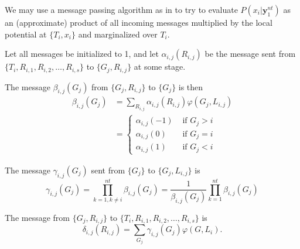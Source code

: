 
We may use a message passing algorithm as in \cite{aji} to try to
evaluate  $P(x_i|\mathbf{y}_1^{nt})$ as an (approximate) product
of all incoming messages multiplied by the local potential at
$\{T_i,x_i\}$ and marginalized over $T_i$.

Let all messages be initialized to 1, and let
$\alpha_{i,j}(R_{i,j})$ be the message sent from $\{T_i,
R_{i,1},R_{i,2},\dots, R_{i,s}\}$ to $\{G_j,R_{i,j}\}$ at some
stage.

The message $\beta_{i,j}(G_j)$ from $\{G_j,R_{i,j}\}$ to $\{G_j\}$
is then
\begin{eqnarray*}
\beta_{i,j}(G_j)&=\sum_{R_{i,j}}\alpha_{i,j}(R_{i,j})\varphi
(G_j,L_{i,j})\\
{}&=\left\{ \begin{array}{ccc}\alpha_{i,j}(-1) & \text{ if }
G_j>i\\
\alpha_{i,j}(0) & \text{ if }
G_j=i\\
\alpha_{i,j}(1) & \text{ if } G_j<i
\end{array}\right.
\end{eqnarray*}

The message $\gamma_{i,j}(G_j)$ sent from $\{G_j\}$ to
$\{G_j,L_{i,j}\}$ is
\begin{equation}
\gamma_{i,j}(G_j)=\prod_{k=1,k\neq
i}^{nt}\beta_{i,j}(G_j)=\frac{1}{\beta_{i,j}(G_j)}\prod_{k=1}^{nt}\beta_{i,j}(G_j)
\end{equation}

The message from $\{G_j,R_{i,j}\}$ to $\{T_i,
R_{i,1},R_{i,2},\dots, R_{i,s}\}$  is
\begin{equation}
\delta_{i,j}(R_{i,j})=\sum_{G_j}\gamma_{i,j}(G_j)\varphi(G,L_i).
\end{equation}

